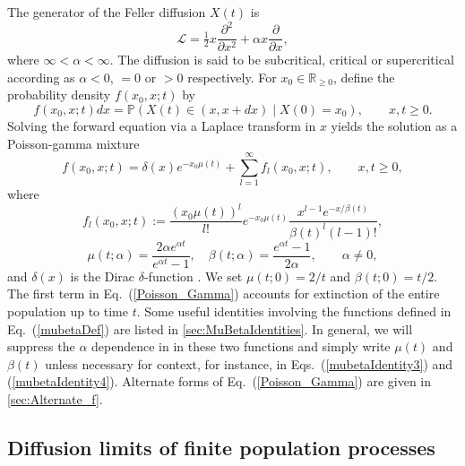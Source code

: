 \documentclass[preprint,12pt]{elsarticle}
\begin{document}
The generator of the Feller diffusion $X(t)$ is 
\begin{equation}	\label{FellerGenerator}
\mathcal{L} = \tfrac{1}{2} x \frac{\partial^2}{\partial x^2}+ \alpha x \frac{\partial}{\partial x}, 
\end{equation}
where $\infty < \alpha < \infty$.  The diffusion is said to be subcritical, critical or supercritical according as $\alpha <0$, $= 0$ or $> 0$ respectively.  
For $x_0 \in \mathbb{R}_{\ge 0}$, define the probability density $f(x_0, x; t)$ by 
\[
f(x_0, x; t) dx = \mathbb{P}(X(t) \in(x, x + dx) \mid X(0) = x_0), \qquad x, t \ge 0.
\]
Solving the forward equation via a Laplace transform in $x$ \citetext{\citealp[Section~5.11]{Cox78}; \citealp[Section~3]{BurdenGriffiths23}} yields the solution as a Poisson-gamma mixture 
\begin{equation}	\label{Poisson_Gamma}
f(x_0, x; t) = \delta(x) e^{-x_0 \mu(t)} + \sum_{l = 1}^\infty f_l(x_0, x; t), \qquad x, t \ge 0, 
\end{equation}
where
\begin{equation}	\label{flDef}
f_l(x_0, x; t) := \frac{(x_0 \mu(t))^l}{l!}e^{-x_0 \mu(t)}  \frac{x^{l - 1} e^{-x/\beta(t)}}{\beta(t)^l (l - 1)!}, 
\end{equation}
\begin{equation}	\label{mubetaDef}
\mu(t; \alpha) = \frac{2\alpha e^{\alpha t}}{e^{\alpha t} - 1}, \quad \beta(t; \alpha) = \frac{e^{\alpha t} - 1}{2\alpha}, \qquad \alpha \ne 0, 
\end{equation} 
and $\delta(x)$ is the Dirac $\delta$-function \citep[Section~15]{Dirac58}.  We set $\mu(t; 0) = 2/t$ and $\beta(t; 0) = t/2$.  
The first term in Eq.~(\ref{Poisson_Gamma}) accounts for extinction of the entire population up to time $t$.  Some useful identities involving the functions defined in Eq.~(\ref{mubetaDef}) are listed in \ref{sec:MuBetaIdentities}.  In general, we will suppress the $\alpha$ dependence in in these two functions and simply write 
$\mu(t)$ and $\beta(t)$ unless necessary for context, for instance, in Eqs.~(\ref{mubetaIdentity3}) and (\ref{mubetaIdentity4}).     
Alternate forms of Eq.~(\ref{Poisson_Gamma}) are given in \ref{sec:Alternate_f}.  

%

\subsection{Diffusion limits of finite population processes}
\label{sec:DiffusionLimits}
\end{document}
